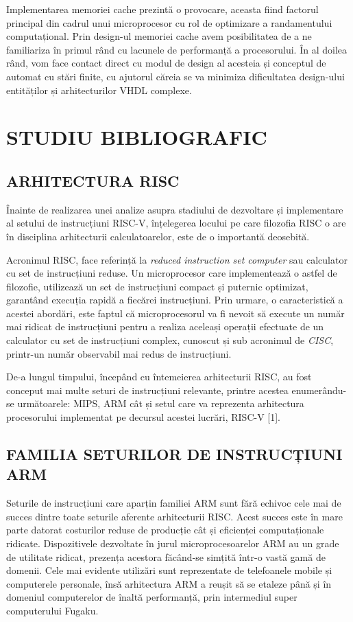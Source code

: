 \documentclass[12pt]{article}
\begin{document}
Implementarea memoriei cache prezintă o provocare, aceasta fiind factorul principal din cadrul unui microprocesor cu rol de optimizare a randamentului computațional. Prin design-ul memoriei cache avem posibilitatea de a ne familiariza în primul rând cu lacunele de performanță a procesorului. În al doilea rând, vom face contact direct cu modul de design al acesteia și conceptul de automat cu stări finite, cu ajutorul căreia se va minimiza dificultatea design-ului entităților și arhitecturilor VHDL complexe.

\newpage
\section{\centering STUDIU BIBLIOGRAFIC}
\bigbreak
\subsection{ARHITECTURA RISC}
Înainte de realizarea unei analize asupra stadiului de dezvoltare și implementare al setului de instrucțiuni RISC-V, înțelegerea locului pe care filozofia RISC o are în disciplina arhitecturii calculatoarelor, este de o importantă deosebită.

Acronimul RISC, face referință la \textit{reduced instruction set computer} sau calculator cu set de instrucțiuni reduse. Un microprocesor care implementează o astfel de filozofie, utilizează un set de instrucțiuni compact și puternic optimizat, garantând execuția rapidă a fiecărei instrucțiuni. Prin urmare, o caracteristică a acestei abordări, este faptul că microprocesorul va fi nevoit să execute un număr mai ridicat de instrucțiuni pentru a realiza aceleași operații efectuate de un calculator cu set de instrucțiuni complex, cunoscut și sub acronimul de \textit{CISC}, printr-un număr observabil mai redus de instrucțiuni.

De-a lungul timpului, începând cu întemeierea arhitecturii RISC, au fost conceput mai multe seturi de instrucțiuni relevante, printre acestea enumerându-se următoarele: MIPS, ARM cât și setul care va reprezenta arhitectura procesorului implementat pe decursul acestei lucrări, RISC-V [1].

\subsection{FAMILIA SETURILOR DE INSTRUCȚIUNI ARM}
Seturile de instrucțiuni care aparțin familiei ARM sunt fără echivoc cele mai de succes dintre toate seturile aferente arhitecturii RISC. Acest succes este în mare parte datorat costurilor reduse de producție cât și eficienței computaționale ridicate. Dispozitivele dezvoltate în jurul microprocesoarelor ARM au un grade de utilitate ridicat, prezența acestora făcând-se simțită într-o vastă gamă de domenii. Cele mai evidente utilizări sunt reprezentate de telefoanele mobile și computerele personale, însă arhitectura ARM a reușit să se etaleze până și în domeniul computerelor de înaltă performanță, prin intermediul super computerului Fugaku.
\end{document}
